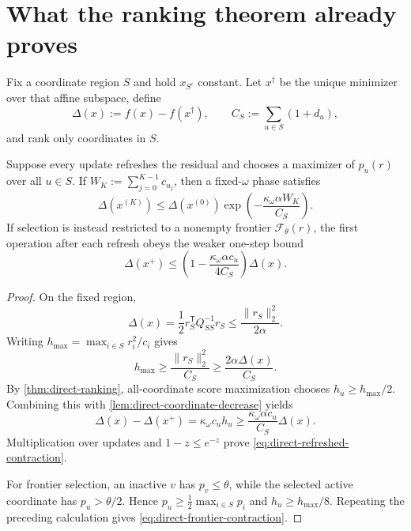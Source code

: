 \section{What the ranking theorem already proves}
\label{sec:direct-fixed-region}

Fix a coordinate region $S$ and hold $x_{S^c}$ constant. Let $x^\dagger$
be the unique minimizer over that affine subspace, define
\begin{equation}
 \Delta(x):=f(x)-f(x^\dagger),
 \qquad
 C_S:=\sum_{u\in S}(1+d_u),
 \label{eq:direct-fixed-region-quantities}
\end{equation}
and rank only coordinates in $S$.

\begin{theorem}
\label{thm:direct-refreshed-contraction}
Suppose every update refreshes the residual and chooses a maximizer of
$p_u(r)$ over all $u\in S$. If
$W_K:=\sum_{j=0}^{K-1}c_{u_j}$, then a fixed-$\omega$ phase satisfies
\begin{equation}
 \Delta(x^{(K)})
 \leq\Delta(x^{(0)})
 \exp\left(-\frac{\kappa_\omega\alpha W_K}{C_S}\right).
 \label{eq:direct-refreshed-contraction}
\end{equation}
If selection is instead restricted to a nonempty frontier
$\mathcal F_\theta(r)$, the first operation after each refresh obeys the
weaker one-step bound
\begin{equation}
 \Delta(x^+)
 \leq
 \left(1-\frac{\kappa_\omega\alpha c_u}{4C_S}\right)
 \Delta(x).
 \label{eq:direct-frontier-contraction}
\end{equation}
\end{theorem}

\begin{proof}
On the fixed region,
\begin{equation*}
 \Delta(x)=\frac12r_S^\mathsf TQ_{SS}^{-1}r_S
 \leq\frac{\|r_S\|_2^2}{2\alpha}.
\end{equation*}
Writing $h_{\max}=\max_{i\in S}r_i^2/c_i$ gives
\begin{equation*}
 h_{\max}\geq\frac{\|r_S\|_2^2}{C_S}
 \geq\frac{2\alpha\Delta(x)}{C_S}.
\end{equation*}
By \cref{thm:direct-ranking}, all-coordinate score maximization chooses
$h_u\geq h_{\max}/2$. Combining this with
\cref{lem:direct-coordinate-decrease} yields
\begin{equation*}
 \Delta(x)-\Delta(x^+)
 =\kappa_\omega c_uh_u
 \geq\frac{\kappa_\omega\alpha c_u}{C_S}\Delta(x).
\end{equation*}
Multiplication over updates and $1-z\leq e^{-z}$ prove
\cref{eq:direct-refreshed-contraction}.

For frontier selection, an inactive $v$ has $p_v\leq\theta$, while the
selected active coordinate has $p_u>\theta/2$. Hence
$p_u\geq\frac12\max_{i\in S}p_i$ and
$h_u\geq h_{\max}/8$. Repeating the preceding calculation gives
\cref{eq:direct-frontier-contraction}.
\end{proof}

